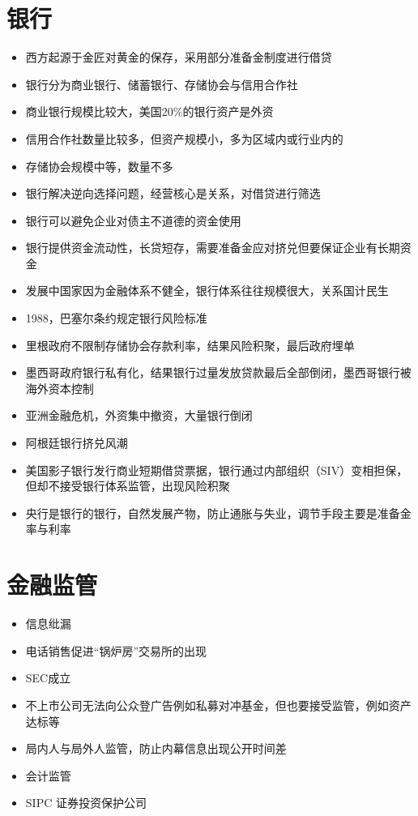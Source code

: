 \documentclass[
]{book}
\providecommand{\tightlist}{%
  \setlength{\itemsep}{0pt}\setlength{\parskip}{0pt}}
\begin{document}
\hypertarget{ux94f6ux884c}{%
\section{银行}\label{ux94f6ux884c}}

\begin{itemize}
\tightlist
\item
  西方起源于金匠对黄金的保存，采用部分准备金制度进行借贷
\item
  银行分为商业银行、储蓄银行、存储协会与信用合作社
\item
  商业银行规模比较大，美国20\%的银行资产是外资
\item
  信用合作社数量比较多，但资产规模小，多为区域内或行业内的
\item
  存储协会规模中等，数量不多
\item
  银行解决逆向选择问题，经营核心是关系，对借贷进行筛选
\item
  银行可以避免企业对债主不道德的资金使用
\item
  银行提供资金流动性，长贷短存，需要准备金应对挤兑但要保证企业有长期资金
\item
  发展中国家因为金融体系不健全，银行体系往往规模很大，关系国计民生
\item
  1988，巴塞尔条约规定银行风险标准
\item
  里根政府不限制存储协会存款利率，结果风险积聚，最后政府埋单
\item
  墨西哥政府银行私有化，结果银行过量发放贷款最后全部倒闭，墨西哥银行被海外资本控制
\item
  亚洲金融危机，外资集中撤资，大量银行倒闭
\item
  阿根廷银行挤兑风潮
\item
  美国影子银行发行商业短期借贷票据，银行通过内部组织（SIV）变相担保，但却不接受银行体系监管，出现风险积聚
\item
  央行是银行的银行，自然发展产物，防止通胀与失业，调节手段主要是准备金率与利率
\end{itemize}

\hypertarget{ux91d1ux878dux76d1ux7ba1}{%
\section{金融监管}\label{ux91d1ux878dux76d1ux7ba1}}

\begin{itemize}
\tightlist
\item
  信息纰漏
\item
  电话销售促进``锅炉房''交易所的出现
\item
  SEC成立
\item
  不上市公司无法向公众登广告例如私募对冲基金，但也要接受监管，例如资产达标等
\item
  局内人与局外人监管，防止内幕信息出现公开时间差
\item
  会计监管
\item
  SIPC 证券投资保护公司
\end{itemize}
\end{document}
